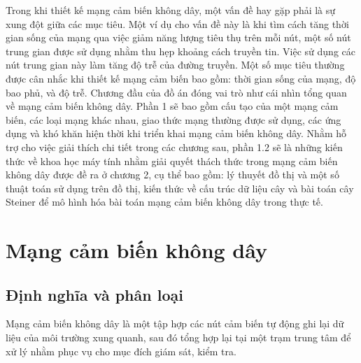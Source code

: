 \documentclass{hust}
\begin{document}
%
%

Trong khi thiết kế mạng cảm biến không dây, một vấn đề hay gặp phải là sự xung đột giữa các mục tiêu. Một ví dụ cho vấn đề này là khi tìm cách tăng thời gian sống của mạng qua việc giảm năng lượng tiêu thụ trên mỗi nút, một số nút trung gian được sử dụng nhằm thu hẹp khoảng cách truyền tin. Việc sử dụng các nút trung gian này làm tăng độ trễ của đường truyền. Một số mục tiêu thường được cân nhắc khi thiết kế mạng cảm biến bao gồm: thời gian sống của mạng, độ bao phủ, và độ trễ.
Chương đầu của đồ án đóng vai trò như cái nhìn tổng quan về mạng cảm biến không dây. Phần 1 sẽ bao gồm cấu tạo của một mạng cảm biến, các loại mạng khác nhau, giao thức mạng thường được sử dụng, các ứng dụng và khó khăn hiện thời khi triển khai mạng cảm biến không dây. Nhằm hỗ trợ cho việc giải thích chi tiết trong các chương sau, phần 1.2 sẽ là những kiến thức về khoa học máy tính nhằm giải quyết thách thức trong mạng cảm biến không dây được đề ra ở chương 2, cụ thể bao gồm: lý thuyết đồ thị và một số thuật toán sử dụng trên đồ thị, kiến thức về cấu trúc dữ liệu cây và bài toán cây Steiner để mô hình hóa bài toán mạng cảm biến không dây trong thực tế.

\section{Mạng cảm biến không dây}
\subsection{Định nghĩa và phân loại}
Mạng cảm biến không dây là một tập hợp các nút cảm biến tự động ghi lại dữ liệu của môi trường xung quanh, sau đó tổng hợp lại tại một trạm trung tâm để xử lý nhằm phục vụ cho mục đích giám sát, kiểm tra.\cite{koviwireless}
\end{document}
